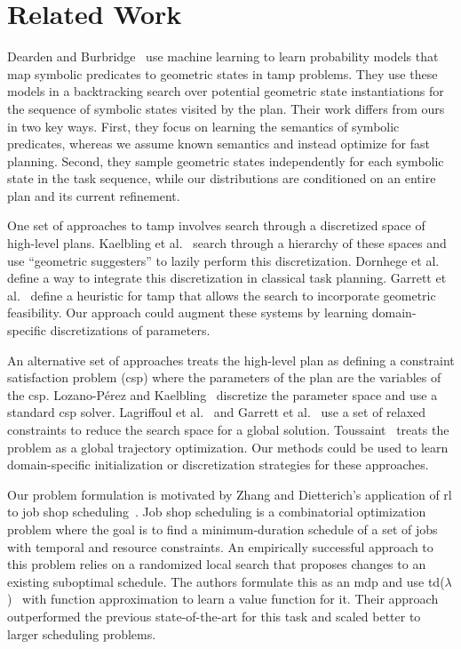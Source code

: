 \section{Related Work}
Dearden and Burbridge~\cite{deardenplanningtamp} use machine learning
to learn probability models that map symbolic predicates to
geometric states in {\sc tamp} problems. They use these models in a
backtracking search over potential geometric state instantiations for
the sequence of symbolic states visited by the plan.  Their work
differs from ours in two key ways. First, they focus on learning the
semantics of symbolic predicates, whereas we assume known semantics
and instead optimize for fast planning. Second, they sample geometric
states independently for each symbolic state in the task sequence,
while our distributions are conditioned on an entire plan and its
current refinement.

One set of approaches to {\sc tamp} involves search through a discretized space
of high-level plans. Kaelbling et al.~\cite{kaelbling2011hierarchical} search
through a hierarchy of these spaces and use ``geometric suggesters''
to lazily perform this discretization. Dornhege et
al.~\cite{dornhege2012semantic} define a way to integrate this
discretization in classical task planning. Garrett et
al.~\cite{GarrettWAFR14} define a heuristic for {\sc tamp} that allows
the search to incorporate geometric feasibility. Our approach could
augment these systems by learning domain-specific discretizations of
parameters.

An alternative set of approaches treats the high-level plan as defining a
constraint satisfaction problem ({\sc csp}) where the parameters of the plan
are the variables of the {\sc csp}. Lozano-P{\'e}rez and
Kaelbling~\cite{lozano2014constraint} discretize the parameter space
and use a standard {\sc csp} solver. Lagriffoul et
al.~\cite{lagriffoul2014orientation} and Garrett et
al.~\cite{garrett2015backward} use a set of relaxed constraints to
reduce the search space for a global
solution. Toussaint~\cite{toussaint2015logic} treats the problem as a
global trajectory optimization. Our methods could be used to learn
domain-specific initialization or discretization strategies for these
approaches.

Our problem formulation is motivated by Zhang and Dietterich's
application of {\sc rl} to job shop
scheduling~\cite{JobShopSched}. Job shop scheduling is a combinatorial
optimization problem where the goal is to find a minimum-duration
schedule of a set of jobs with temporal and resource constraints. An
empirically successful approach to this problem relies on a randomized
local search that proposes changes to an existing suboptimal
schedule. The authors formulate this as an {\sc mdp} and use {\sc
  td}($\lambda$)~\cite{suttonbarto} with function approximation to
learn a value function for it. Their approach outperformed the
previous state-of-the-art for this task and scaled better to larger scheduling
problems.

